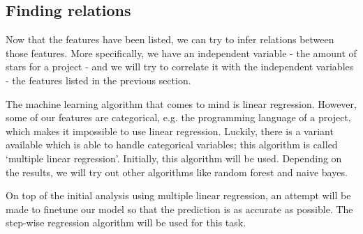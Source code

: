     
    
    \subsection{Finding relations}
        Now that the features have been listed, we can try to infer relations between those features. More specifically, we have an independent variable - the amount of stars for a project - and we will try to correlate it with the independent variables - the features listed in the previous section.
        
        The machine learning algorithm that comes to mind is linear regression. However, some of our features are categorical, e.g. the programming language of a project, which makes it impossible to use linear regression.
        Luckily, there is a variant available which is able to handle categorical variables; this algorithm is called `multiple linear regression'. 
        Initially, this algorithm will be used. Depending on the results, we will try out other algorithms like random forest and naive bayes.
        
        On top of the initial analysis using multiple linear regression, an attempt will be made to finetune our model so that the prediction is as accurate as possible. The step-wise regression algorithm will be used for this task.
    
